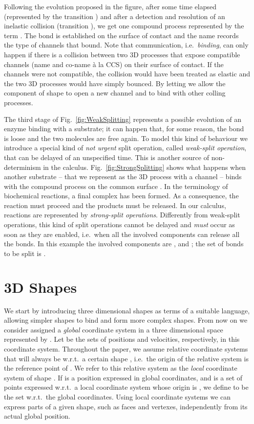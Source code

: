 \documentclass[11pt]{article}
\begin{document}
Following the evolution proposed in the figure, after some time  elapsed (represented by the transition ) and after a detection and resolution of an inelastic collision (transition ), we get one compound process represented by the term . The bond is established on the surface of contact  and the name  records the type of channels that bound. Note that communication, i.e.\ {\em binding}, can only happen if there is a collision between two 3D processes that expose compatible channels (name and co-name \`a la CCS) on their surface of contact. If the channels were not compatible, the collision would have been treated as elastic and the two 3D processes would have simply bounced. By letting  we allow the component of shape  to open a new channel and to bind with other colling processes.

The third stage of Fig.~\ref{fig:WeakSplitting} represents a possible evolution of an enzyme binding with a substrate; it can happen that, for some reason, the bond is loose and the two molecules are free again. To model this kind of behaviour we introduce a special kind of {\em not urgent} split operation, called {\em weak-split operation}, that can be delayed of an unspecified time. This is another source of non-determinism in the calculus. Fig.~\ref{fig:StrongSplitting} shows what happens when another substrate -- that we represent as the 3D process  with a channel   -- binds with the compound process  on the common surface . In the terminology of biochemical reactions, a final complex has been formed. As a consequence, the reaction must proceed and the products must be released. In our calculus, reactions are represented by  {\em strong-split operations}. Differently from weak-split operations, this kind of split operations cannot be delayed and {\em must} occur as soon as they are enabled, i.e.\ when all the involved components can release all the bonds. In this example the involved components are ,  and ; the set of bonds to be split is .

\section{3D Shapes}
\label{sec:3ds}

We start by introducing three dimensional shapes as terms of a suitable language, allowing simpler shapes to bind and form more complex shapes. From now on we consider assigned a {\em global} coordinate system in a three dimensional space represented by . Let  be the sets of positions and velocities, respectively, in this coordinate system. Throughout the paper, we assume relative coordinate systems that will always be w.r.t.\ a certain shape , i.e.\ the origin of the relative system is the reference point  of . We refer to this relative system as the {\em local} coordinate system of shape . If  is a position expressed in global coordinates, and  is a set of points expressed w.r.t.\ a local coordinate system whose origin is , we define  to be the set  w.r.t.\ the global coordinates. Using local coordinate systems we can express parts of a given shape, such as faces and vertexes, independently from its actual global position.
\end{document}
